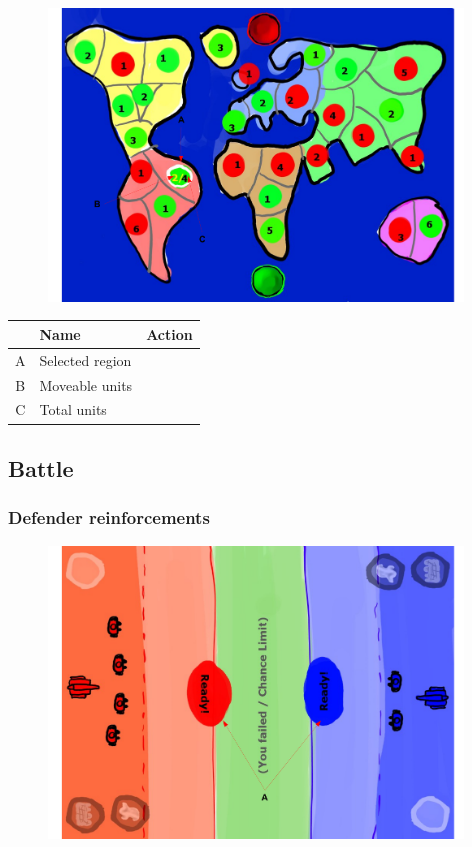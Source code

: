 \documentclass[12pt,a4paper]{article}
\begin{document}
\begin{figure}[H]
  \centering
  \includegraphics[width=11cm]{pic/mocks/5-5.pdf}
\end{figure}

\begin{table}[H]
\small
\centering
\begin{tabular}{c|p{5cm}|p{7cm}}
& Name & Action \\ \hline\hline
A
&Selected region
&
\\B
&Moveable units
&
\\C
&Total units
&
\end{tabular}
\end{table}


\subsection{Battle}

\subsubsection{Defender reinforcements}

\begin{figure}[H]
  \centering
  \includegraphics[width=11cm]{pic/mocks/6-1.pdf}
\end{figure}
\end{document}
